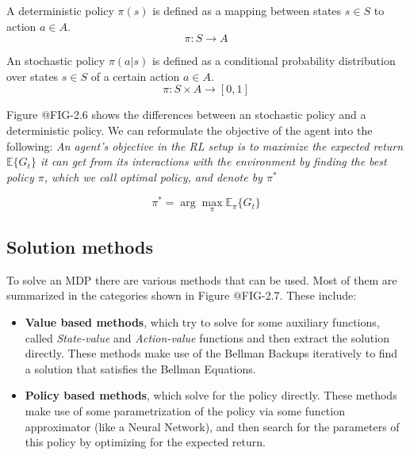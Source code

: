 \begin{definition}
    A deterministic policy $\pi(s)$ is defined as a mapping between states $s \in S$
    to action $a \in A$.
    \begin{equation}
        \pi : S \rightarrow A
    \end{equation}
\end{definition}

\begin{definition}
    An stochastic policy $\pi(a|s)$ is defined as a conditional probability distribution over
    states $s \in S$ of a certain action $a \in A$.
    \begin{equation}
        \pi : S \times A \rightarrow [0,1]
    \end{equation}
\end{definition}

\figRlPolicies

Figure @FIG-2.6 shows the differences between an stochastic policy and a deterministic
policy. We can reformulate the objective of the agent into the following: \textit{An agent's objective
in the RL setup is to maximize the expected return $\mathbb{E} \lbrace G_{t} \rbrace$ it
can get from its interactions with the environment by finding the best policy $\pi$, which
we call optimal policy, and denote by $\pi^{*}$}

\begin{equation}
    \pi^{*} = \arg \max_{\pi} \mathbb{E}_{\pi} \lbrace G_{t} \rbrace
\end{equation}

\subsection{Solution methods}

\figRlMethodsLandspace

To solve an MDP there are various methods that can be used. Most of them are
summarized in the categories shown in Figure @FIG-2.7. These include:

\begin{itemize}
    \item \textbf{Value based methods}, which try to solve for some auxiliary
          functions, called \textit{State-value} and \textit{Action-value} functions
          and then extract the solution directly. These methods make use of the Bellman
          Backups iteratively to find a solution that satisfies the Bellman Equations.
    \item \textbf{Policy based methods}, which solve for the policy directly. These methods
          make use of some parametrization of the policy via some function approximator
          (like a Neural Network), and then search for the parameters of this policy
          by optimizing for the expected return.
\end{itemize}

